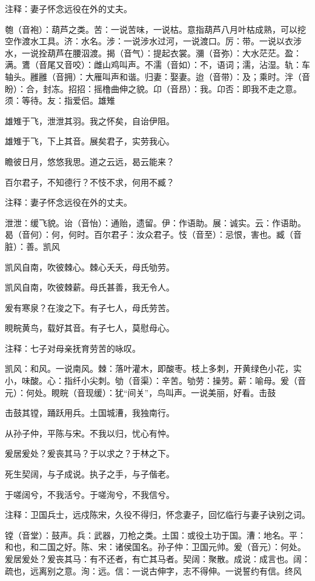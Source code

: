 \documentclass[12pt,UTF8]{ctexbook}
\begin{document}
注释：妻子怀念远役在外的丈夫。

匏（音袍）：葫芦之类。苦：一说苦味，一说枯。意指葫芦八月叶枯成熟，可以挖空作渡水工具。济：水名。涉：一说涉水过河，一说渡口。厉：带。一说以衣涉水，一说拴葫芦在腰泅渡。揭（音气）：提起衣裳。瀰（音弥）：大水茫茫。盈：满。鷕（音尾又音咬）：雌山鸡叫声。不濡（音如）：不，语词；濡，沾湿。轨：车轴头。雝雝（音拥）：大雁叫声和谐。归妻：娶妻。迨（音带）：及；乘时。泮（音盼）：合，封冻。招招：摇橹曲伸之貌。卬（音昂）：我。卬否：即我不走之意。须：等待。友：指爱侣。雄雉

雄雉于飞，泄泄其羽。我之怀矣，自诒伊阻。

雄雉于飞，下上其音。展矣君子，实劳我心。

瞻彼日月，悠悠我思。道之云远，曷云能来？

百尔君子，不知德行？不忮不求，何用不臧？

注释：妻子怀念远役在外的丈夫。

泄泄：缓飞貌。诒（音怡）：通贻，遗留。伊：作语助。展：诚实。云：作语助。曷（音何）：何，何时。百尔君子：汝众君子。忮（音至）：忌恨，害也。臧（音脏）：善。凯风

凯风自南，吹彼棘心。棘心夭夭，母氏劬劳。

凯风自南，吹彼棘薪。母氏甚善，我无令人。

爰有寒泉？在浚之下。有子七人，母氏劳苦。

睍睆黄鸟，载好其音。有子七人，莫慰母心。

注释：七子对母亲抚育劳苦的咏叹。

凯风：和风。一说南风。棘：落叶灌木，即酸枣。枝上多刺，开黄绿色小花，实小，味酸。心：指纤小尖刺。劬（音渠）：辛苦。劬劳：操劳。薪：喻母。爰（音元）：何处。睍睆（音现缓）：犹“间关”，鸟叫声。一说美丽，好看。击鼓

击鼓其镗，踊跃用兵。土国城漕，我独南行。

从孙子仲，平陈与宋。不我以归，忧心有忡。

爰居爰处？爰丧其马？于以求之？于林之下。

死生契阔，与子成说。执子之手，与子偕老。

于嗟阔兮，不我活兮。于嗟洵兮，不我信兮。

注释：卫国兵士，远戍陈宋，久役不得归，怀念妻子，回忆临行与妻子诀别之词。

镗（音堂）：鼓声。兵：武器，刀枪之类。土国：或役土功于国。漕：地名。平：和也，和二国之好。陈、宋：诸侯国名。孙子仲：卫国元帅。爰（音元）：何处。爰居爰处？爰丧其马：有不还者，有亡其马者。契阔：聚散。成说：成言也。阔：疏也，远离别之意。洵：远。信：一说古伸字，志不得伸。一说誓约有信。终风
\end{document}

